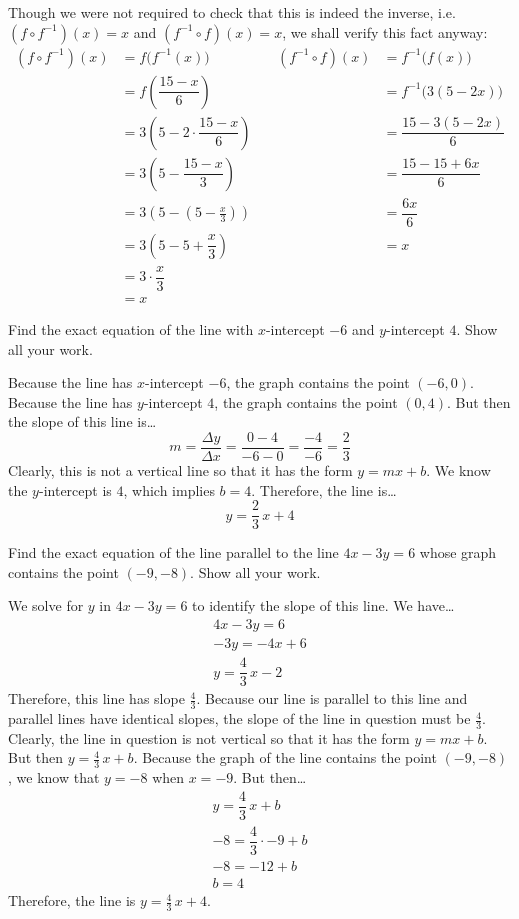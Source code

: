 \documentclass[12pt,letterpaper]{exam}
\begin{document}
\begin{questions}
Though we were not required to check that this is indeed the inverse, i.e. $(f \circ f^{-1})(x)= x$ and $(f^{-1} \circ f)(x)= x$, we shall verify this fact anyway:
	\[
	\begin{aligned}
	(f \circ f^{-1})(x)&= f \big( f^{-1}(x) \big) \qquad\qquad& (f^{-1} \circ f)(x)&= f^{-1} \big( f(x) \big) \\
	&= f \left( \dfrac{15 - x}{6} \right) & &= f^{-1} \big( 3(5 - 2x) \big) \\
	&= 3 \left( 5 - 2 \cdot \dfrac{15 - x}{6} \right) & &= \dfrac{15 - 3(5 - 2x)}{6} \\
	&= 3 \left(5 - \dfrac{15 - x}{3} \right) & &= \dfrac{15 - 15 + 6x}{6} \\
	&= 3 \left(5 - \left(5 - \frac{x}{3} \right) \right) & &= \dfrac{6x}{6} \\
	&= 3 \left(5 - 5 + \dfrac{x}{3} \right) & &= x \\
	&= 3 \cdot \dfrac{x}{3} \\
	&= x
	\end{aligned}
	\]



\newpage
\question[10] Find the exact equation of the line with $x$-intercept $-6$ and $y$-intercept $4$. Show all your work. \pspace

\sol Because the line has $x$-intercept $-6$, the graph contains the point $(-6, 0)$. Because the line has $y$-intercept $4$, the graph contains the point $(0, 4)$. But then the slope of this line is\dots
	\[
	m= \dfrac{\Delta y}{\Delta x}= \dfrac{0 - 4}{-6 - 0}= \dfrac{-4}{-6}= \dfrac{2}{3}
	\]
Clearly, this is not a vertical line so that it has the form $y= mx + b$. We know the $y$-intercept is $4$, which implies $b= 4$. Therefore, the line is\dots
	\[
	y= \dfrac{2}{3}\,x + 4
	\]



\newpage
\question[10] Find the exact equation of the line parallel to the line $4x - 3y= 6$ whose graph contains the point $(-9, -8)$. Show all your work. \pspace

\sol We solve for $y$ in $4x - 3y= 6$ to identify the slope of this line. We have\dots
	\[
	\begin{gathered}
	4x - 3y= 6 \\
	-3y= -4x + 6 \\
	y= \dfrac{4}{3}\,x - 2
	\end{gathered}
	\]
Therefore, this line has slope $\frac{4}{3}$. Because our line is parallel to this line and parallel lines have identical slopes, the slope of the line in question must be $\frac{4}{3}$. Clearly, the line in question is not vertical so that it has the form $y= mx + b$. But then $y= \frac{4}{3}\,x + b$. Because the graph of the line contains the point $(-9, -8)$, we know that $y= -8$ when $x= -9$. But then\dots
	\[
	\begin{gathered}
	y= \dfrac{4}{3}\,x + b \\
	-8= \dfrac{4}{3} \cdot -9 + b \\
	-8= -12 + b \\
	b= 4
	\end{gathered}
	\]
Therefore, the line is $y= \frac{4}{3}\,x + 4$. \pspace


\end{questions}
\end{document}

